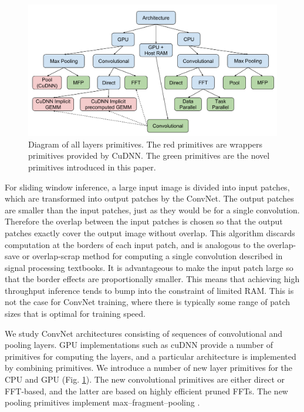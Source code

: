 \documentclass[conference]{./IEEEtran/IEEEtran}
\begin{document}
  \begin{figure}
    \begin{center}
      \includegraphics[width=0.99\columnwidth]{fig/alllayersram.pdf}
    \end{center}
    \caption{Diagram of all layers primitives.  The red primitives are
      wrappers primitives provided by CuDNN.  The green primitives are
      the novel primitives introduced in this paper.}
    \label{fig:layers}
  \end{figure}


For sliding window inference, a large input image is divided into
input patches, which are transformed into output patches by the
ConvNet.  The output patches are smaller than the input patches, just
as they would be for a single convolution. Therefore the overlap
between the input patches is chosen so that the output patches exactly
cover the output image without overlap. This algorithm discards
computation at the borders of each input patch, and is analogous to
the overlap-save or overlap-scrap method for computing a single
convolution described in signal processing textbooks.  It is
advantageous to make the input patch large so that the border effects
are proportionally smaller.  This means that achieving high throughput
inference tends to bump into the constraint of limited RAM.  This is
not the case for ConvNet training, where there is typically some range
of patch sizes that is optimal for training speed.

We study ConvNet architectures consisting of sequences of
convolutional and pooling layers.  GPU implementations such as cuDNN
provide a number of primitives for computing the layers, and a
particular architecture is implemented by combining primitives.  We
introduce a number of new layer primitives for the CPU and GPU
(Fig. \ref{fig:layers}). The new convolutional primitives are either
direct or FFT-based, and the latter are based on highly efficient
pruned FFTs.  The new pooling primitives implement
max--fragment--pooling \cite{giusti2013fast, masci2013fast}.
\end{document}

